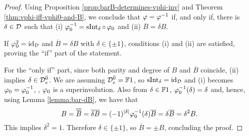 \begin{proof}
    Using Proposition \ref{prop:barB-determines-vphi-inv} and Theorem \ref{thm:vphi-iff-vphi0-and-B}, we conclude that $\varphi = \varphi^{-1}$ if, and only if, there is $\delta \in \mathcal{D}$ such that (i) $\varphi_0^{-1} = \operatorname{sInt}_\delta \circ \,\varphi_0$ and (ii) $\overline {B} = \delta B$. 
    
    If $\varphi_0^2 =\operatorname{id}_{\mathcal{D}}$ and $\overline{B} = \delta B$ with $\delta \in \{\pm 1\}$, conditions (i) and (ii) are satisfied, proving the ``if'' part of the statement. 

    For the ``only if'' part, since both parity and degree of $B$ and $\overline {B}$ coincide, (ii) implies $\delta \in \mathcal{D}^{\bar0}_e$. 
    We are assuming $\mathcal{D}^{\bar0}_e = \mathbb{F} 1$, so $\operatorname{sInt}_\delta = \operatorname{id}_{\mathcal{D}}$ and (i) becomes $\varphi_0 = \varphi_0^{-1}$, \ie, $\varphi_0$ is a superinvolution. 
    Also from $\delta \in \mathbb{F} 1$, $\varphi_0^{-1}(\delta) = \delta$ and, hence, using Lemma \ref{lemma:bar-dB}, we have that
    \[
        B = \overline {\overline B} = \overline {\delta B} = (-1)^{|\delta|} \varphi_0^{-1}(\delta) \overline B= \delta \overline B = \delta^2 B.
    \]
    This implies $\delta^2 = 1$. 
    Therefore $\delta \in \{ \pm 1 \}$, so $\overline B = \pm B$, concluding the proof. 
\end{proof}






